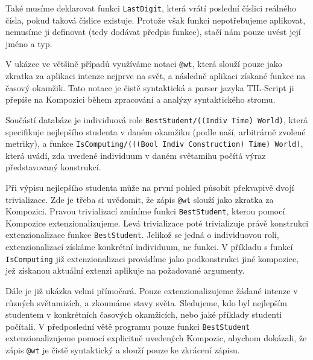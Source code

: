 Také musíme deklarovat funkci \lstinline{LastDigit}, která vrátí poslední číslici reálného čísla,
pokud taková číslice existuje. Protože však funkci nepotřebujeme aplikovat, nemusíme ji definovat
(tedy dodávat předpis funkce), stačí nám pouze uvést její jméno a typ.

V ukázce ve většině případů využíváme notaci \lstinline{@wt}, která slouží pouze jako zkratka
za aplikaci intenze nejprve na svět, a následně aplikaci získané funkce na časový okamžik. Tato
notace je čistě syntaktická a parser jazyka TIL-Script ji přepíše na Kompozici během zpracování
a analýzy syntaktického stromu.

Součástí databáze je individuová role \lstinline{BestStudent/((Indiv Time) World)}, která
specifikuje nejlepšího studenta v daném okamžiku (podle naší, arbitrárně zvolené metriky), a
funkce \lstinline{IsComputing/(((Bool Indiv Construction) Time) World)}, která uvádí, zda
uvedené individuum v daném světamihu počítá výraz představovaný konstrukcí.

Při výpisu nejlepšího studenta může na první pohled působit překvapivě dvojí trivializace. Zde je
třeba si uvědomit, že zápis \lstinline{@wt} slouží jako zkratka za Kompozici. Pravou trivializací
zmíníme funkci \lstinline{BestStudent}, kterou pomocí Kompozice extenzionalizujeme. Levá
trivializace poté trivializuje právě konstrukci extenzionalizace funkce \lstinline{BestStudent}.
Jelikož se jedná o individuovou roli, extenzionalizací získáme konkrétní individuum, ne funkci.
V příkladu s funkcí \lstinline{IsComputing} již extenzionalizaci provádíme jako podkonstrukci jiné
kompozice, jež získanou aktuální extenzi aplikuje na požadované argumenty.

Dále je již ukázka velmi přímočará. Pouze extenzionalizujeme žádané intenze v různých světamizích,
a zkoumáme stavy světa. Sledujeme, kdo byl nejlepším studentem v konkrétních časových okamžicích,
nebo jaké příklady studenti počítali. V předposlední větě programu pouze funkci
\lstinline{BestStudent} extenzionalizujeme pomocí explicitně uvedených Kompozic, abychom dokázali,
že zápis \lstinline{@wt} je čistě syntaktický a slouží pouze ke zkrácení zápisu.

